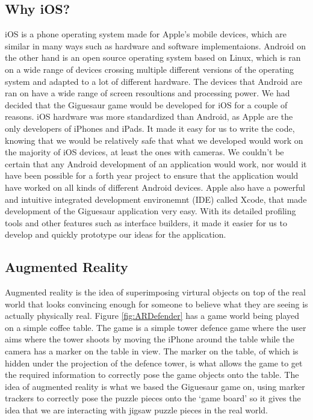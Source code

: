 \documentclass{article}
\begin{document}
\subsection{Why iOS?}
iOS is a phone operating system made for Apple's mobile devices, which are
similar in many ways such as hardware and software implementaions. Android on
the other hand is an open source operating system based on Linux, which is ran
on a wide range of devices crossing multiple different versions of the operating
system and adapted to a lot of different hardware. The devices that Android are
ran on have a wide range of screen resoultions and processing power. We had
decided that the Giguesaur game would be developed for iOS for a couple of
reasons. iOS hardware was more standardized than Android, as Apple are the only
developers of iPhones and iPads. It made it easy for us to write the code,
knowing that we would be relatively safe that what we developed would work on the
majority of iOS devices, at least the ones with cameras. We couldn't be certain
that any Android development of an application would work, nor would it have
been possible for a forth year project to ensure that the application would have
worked on all kinds of different Android devices. Apple also have a powerful and
intuitive integrated development environemnt (IDE) called Xcode, that made
development of the Giguesaur application very easy. With its detailed profiling
tools and other features such as interface builders, it made it easier for us to
develop and quickly prototype our ideas for the application.

\subsection{Augmented Reality}
Augmented reality is the idea of superimposing virtural objects on top of the
real world that looks convincing enough for someone to believe what they are
seeing is actually physically real. Figure \ref{fig:ARDefender} has a game
world being played on a simple coffee table. The game is a simple tower defence
game where the user aims where the tower shoots by moving the iPhone around the
table while the camera has a marker on the table in view. The marker on the
table, of which is hidden under the projection of the defence tower, is what
allows the game to get the required information to correctly pose the game
objects onto the table. The idea of augmented reality is what we based the
Giguesaur game on, using marker trackers to correctly pose the puzzle pieces
onto the `game board' so it gives the idea that we are interacting with jigsaw
puzzle pieces in the real world.
\end{document}
